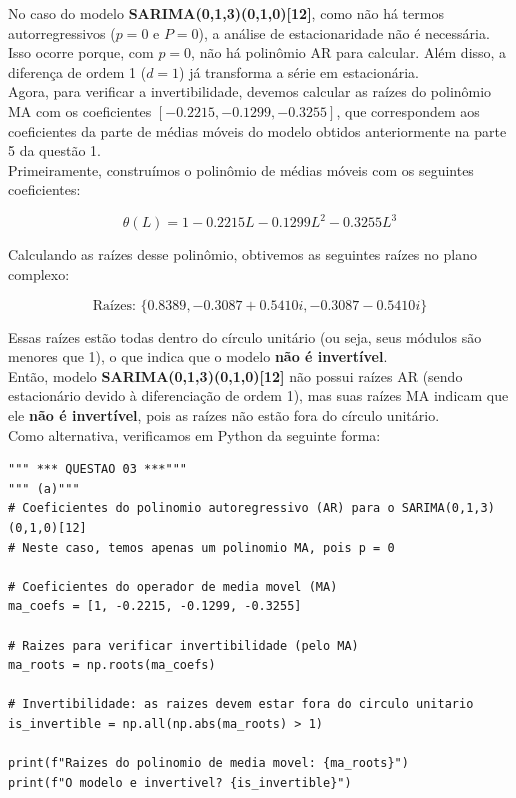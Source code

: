 \documentclass[a4paper, 12pt]{article}
\begin{document}
No caso do modelo \textbf{SARIMA(0,1,3)(0,1,0)[12]}, como não há termos autorregressivos (\(p = 0\) e \(P = 0\)), a análise de estacionaridade não é necessária. Isso ocorre porque, com \(p = 0\), não há polinômio AR para calcular. Além disso, a diferença de ordem 1 (\(d = 1\)) já transforma a série em estacionária.\\

Agora, para verificar a invertibilidade, devemos calcular as raízes do polinômio MA com os coeficientes \([-0.2215, -0.1299, -0.3255]\), que correspondem aos coeficientes da parte de médias móveis do modelo obtidos anteriormente na parte 5 da  questão 1. \\

Primeiramente, construímos o polinômio de médias móveis com os seguintes coeficientes:

\[
\theta(L) = 1 - 0.2215L - 0.1299L^2 - 0.3255L^3
\]

Calculando as raízes desse polinômio, obtivemos as seguintes raízes no plano complexo:

\[
\text{Raízes: } \{ 0.8389, -0.3087 + 0.5410i, -0.3087 - 0.5410i \}
\]

Essas raízes estão todas dentro do círculo unitário (ou seja, seus módulos são menores que 1), o que indica que o modelo \textbf{não é invertível}.\\

Então, modelo \textbf{SARIMA(0,1,3)(0,1,0)[12]} não possui raízes AR (sendo estacionário devido à diferenciação de ordem 1), mas suas raízes MA indicam que ele \textbf{não é invertível}, pois as raízes não estão fora do círculo unitário.\\

Como alternativa, verificamos em Python da seguinte forma:\\

\begin{lstlisting}[style=python]
""" *** QUESTAO 03 ***"""
""" (a)"""
# Coeficientes do polinomio autoregressivo (AR) para o SARIMA(0,1,3)(0,1,0)[12]
# Neste caso, temos apenas um polinomio MA, pois p = 0

# Coeficientes do operador de media movel (MA)
ma_coefs = [1, -0.2215, -0.1299, -0.3255]

# Raizes para verificar invertibilidade (pelo MA)
ma_roots = np.roots(ma_coefs)

# Invertibilidade: as raizes devem estar fora do circulo unitario
is_invertible = np.all(np.abs(ma_roots) > 1)

print(f"Raizes do polinomio de media movel: {ma_roots}")
print(f"O modelo e invertivel? {is_invertible}")

\end{lstlisting}
\end{document}
